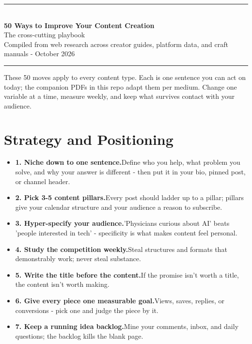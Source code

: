 \documentclass[11pt]{article}
\newcommand{\tip}[2]{\item \textbf{#1.}\enspace #2}
\newcommand{\tlabel}{\textcolor{accent}{\small$\blacktriangleright$}}
\newcommand{\footertitle}{Content Creation Playbook}
\newcommand{\docbanner}[3]{%
  \begin{center}
    {\color{accent}\rule{\textwidth}{1.4pt}}\\[10pt]
    {\Huge\bfseries\color{black} #1}\\[8pt]
    {\large\color{softgray} #2}\\[8pt]
    {\small\color{softgray} #3}\\[6pt]
    {\color{accent}\rule{\textwidth}{1.4pt}}
  \end{center}
  \vspace{6pt}
}
\begin{document}
\renewcommand{\footertitle}{50 Ways to Improve Your Content Creation}
\docbanner{50 Ways to Improve Your Content Creation}{The cross-cutting playbook}{Compiled from web research across creator guides, platform data, and craft manuals - October 2026}
\begin{tcolorbox}[colback=accent!5,colframe=accent,boxrule=0.8pt,arc=2pt,left=8pt,right=8pt,top=6pt,bottom=6pt]
\small These 50 moves apply to every content type. Each is one sentence you can act on today; the companion PDFs in this repo adapt them per medium. Change one variable at a time, measure weekly, and keep what survives contact with your audience.
\end{tcolorbox}
\vspace{6pt}
\section*{Strategy and Positioning}
\begin{itemize}[label=\tlabel]
\tip{1. Niche down to one sentence}{Define who you help, what problem you solve, and why your answer is different - then put it in your bio, pinned post, or channel header.}
\tip{2. Pick 3-5 content pillars}{Every post should ladder up to a pillar; pillars give your calendar structure and your audience a reason to subscribe.}
\tip{3. Hyper-specify your audience}{'Physicians curious about AI' beats 'people interested in tech' - specificity is what makes content feel personal.}
\tip{4. Study the competition weekly}{Steal structures and formats that demonstrably work; never steal substance.}
\tip{5. Write the title before the content}{If the promise isn't worth a title, the content isn't worth making.}
\tip{6. Give every piece one measurable goal}{Views, saves, replies, or conversions - pick one and judge the piece by it.}
\tip{7. Keep a running idea backlog}{Mine your comments, inbox, and daily questions; the backlog kills the blank page.}
\end{itemize}
\end{document}
